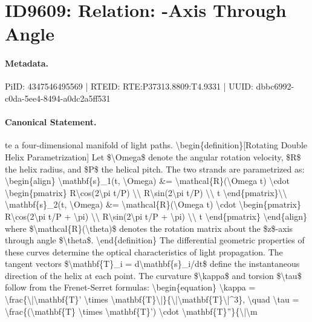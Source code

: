 \section*{ID9609: Relation: -Axis Through Angle}
\paragraph{Metadata.}
PiID: 4347546495569 | RTEID: RTE:P37313.8809:T4.9331 | UUID: dbbc6992-c0da-5ee4-8494-a0dc2a5ff531

\paragraph{Canonical Statement.}
te a four-dimensional manifold of light paths. \textbackslash{}begin\{definition\}[Rotating Double Helix Parametrization] Let \$\textbackslash{}Omega\$ denote the angular rotation velocity, \$R\$ the helix radius, and \$P\$ the helical pitch. The two strands are parametrized as: \textbackslash{}begin\{align\} \textbackslash{}mathbf\{s\}\_1(t, \textbackslash{}Omega) \&= \textbackslash{}mathcal\{R\}(\textbackslash{}Omega t) \textbackslash{}cdot \textbackslash{}begin\{pmatrix\} R\textbackslash{}cos(2\textbackslash{}pi t/P) \textbackslash{}\textbackslash{} R\textbackslash{}sin(2\textbackslash{}pi t/P) \textbackslash{}\textbackslash{} t \textbackslash{}end\{pmatrix\}\textbackslash{}\textbackslash{} \textbackslash{}mathbf\{s\}\_2(t, \textbackslash{}Omega) \&= \textbackslash{}mathcal\{R\}(\textbackslash{}Omega t) \textbackslash{}cdot \textbackslash{}begin\{pmatrix\} R\textbackslash{}cos(2\textbackslash{}pi t/P + \textbackslash{}pi) \textbackslash{}\textbackslash{} R\textbackslash{}sin(2\textbackslash{}pi t/P + \textbackslash{}pi) \textbackslash{}\textbackslash{} t \textbackslash{}end\{pmatrix\} \textbackslash{}end\{align\} where \$\textbackslash{}mathcal\{R\}(\textbackslash{}theta)\$ denotes the rotation matrix about the \$z\$-axis through angle \$\textbackslash{}theta\$. \textbackslash{}end\{definition\} The differential geometric properties of these curves determine the optical characteristics of light propagation. The tangent vectors \$\textbackslash{}mathbf\{T\}\_i = d\textbackslash{}mathbf\{s\}\_i/dt\$ define the instantaneous direction of the helix at each point. The curvature \$\textbackslash{}kappa\$ and torsion \$\textbackslash{}tau\$ follow from the Frenet-Serret formulas: \textbackslash{}begin\{equation\} \textbackslash{}kappa = \textbackslash{}frac\{\textbackslash{}|\textbackslash{}mathbf\{T\}' \textbackslash{}times \textbackslash{}mathbf\{T\}\textbackslash{}|\}\{\textbackslash{}|\textbackslash{}mathbf\{T\}\textbackslash{}|\textasciicircum{}3\}, \textbackslash{}quad \textbackslash{}tau = \textbackslash{}frac\{(\textbackslash{}mathbf\{T\} \textbackslash{}times \textbackslash{}mathbf\{T\}') \textbackslash{}cdot \textbackslash{}mathbf\{T\}''\}\{\textbackslash{}|\textbackslash{}m

